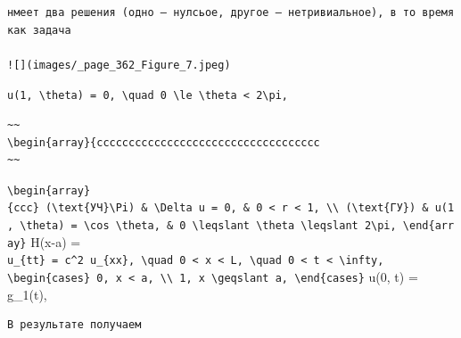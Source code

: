 \documentclass[
  ukrainian,
]{article}
\begin{document}
\begin{verbatim}
нмеет два решения (одно — нулсьое, другое — нетривиальное), в то время как задача

![](images/_page_362_Figure_7.jpeg)
\end{verbatim}

\texttt{u(1,\ \textbackslash{}theta)\ =\ 0,\ \textbackslash{}quad\ 0\ \textbackslash{}le\ \textbackslash{}theta\ \textless{}\ 2\textbackslash{}pi,}

\begin{verbatim}
~~
\begin{array}{ccccccccccccccccccccccccccccccccccc
~~
\end{verbatim}

\texttt{\textbackslash{}begin\{array\}\{ccc\}\ (\textbackslash{}text\{УЧ\}\textbackslash{}Pi)\ \&\ \textbackslash{}Delta\ u\ =\ 0,\ \&\ 0\ \textless{}\ r\ \textless{}\ 1,\ \textbackslash{}\textbackslash{}\ (\textbackslash{}text\{ГУ\})\ \&\ u(1,\ \textbackslash{}theta)\ =\ \textbackslash{}cos\ \textbackslash{}theta,\ \&\ 0\ \textbackslash{}leqslant\ \textbackslash{}theta\ \textbackslash{}leqslant\ 2\textbackslash{}pi,\ \textbackslash{}end\{array\}}
H(x-a) =
\texttt{u\_\{tt\}\ =\ c\^{}2\ u\_\{xx\},\ \textbackslash{}quad\ 0\ \textless{}\ x\ \textless{}\ L,\ \textbackslash{}quad\ 0\ \textless{}\ t\ \textless{}\ \textbackslash{}infty,}
\texttt{\textbackslash{}begin\{cases\}\ 0,\ x\ \textless{}\ a,\ \textbackslash{}\textbackslash{}\ 1,\ x\ \textbackslash{}geqslant\ a,\ \textbackslash{}end\{cases\}}
u(0, t) = g\_1(t),

\begin{verbatim}
В результате получаем
\end{verbatim}
\end{document}
